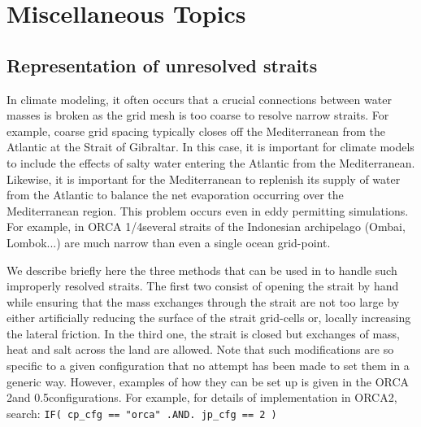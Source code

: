 \documentclass[../main/NEMO_manual]{subfiles}
\begin{document}
\chapter{Miscellaneous Topics}
\label{chap:MISC}

\minitoc

\newpage

\section{Representation of unresolved straits}
\label{sec:MISC_strait}

In climate modeling, it often occurs that a crucial connections between water masses is broken as
the grid mesh is too coarse to resolve narrow straits.
For example, coarse grid spacing typically closes off the Mediterranean from the Atlantic at
the Strait of Gibraltar.
In this case, it is important for climate models to include the effects of salty water entering the Atlantic from
the Mediterranean.
Likewise, it is important for the Mediterranean to replenish its supply of water from the Atlantic to
balance the net evaporation occurring over the Mediterranean region.
This problem occurs even in eddy permitting simulations.
For example, in ORCA 1/4\deg several straits of the Indonesian archipelago (Ombai, Lombok...)
are much narrow than even a single ocean grid-point.

We describe briefly here the three methods that can be used in \NEMO to handle such improperly resolved straits.
The first two consist of opening the strait by hand while ensuring that the mass exchanges through
the strait are not too large by either artificially reducing the surface of the strait grid-cells or,
locally increasing the lateral friction.
In the third one, the strait is closed but exchanges of mass, heat and salt across the land are allowed.
Note that such modifications are so specific to a given configuration that no attempt has been made to
set them in a generic way.
However, examples of how they can be set up is given in the ORCA 2\deg and 0.5\deg configurations.
For example, for details of implementation in ORCA2, search: \texttt{IF( cp\_cfg == "orca" .AND. jp\_cfg == 2 )}
\end{document}
